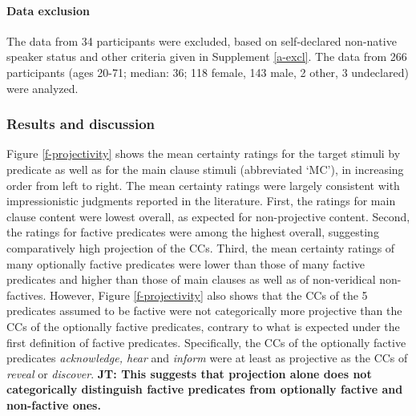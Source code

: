 \documentclass[11pt,fleqn]{article}
\newcommand{\6}{\mbox{$[\hspace*{-.6mm}[$}}
\newcommand{\9}{\mbox{$]\hspace*{-.6mm}]$}}
\newcommand{\jt}[1]{\textbf{\color{blue}JT: #1}}
\begin{document}

\paragraph{Data exclusion} The data from 34 participants were excluded, based on self-declared non-native speaker status and other criteria given in Supplement \ref{a-excl}. The data from 266 participants (ages 20-71; median: 36; 118 female, 143 male, 2 other, 3 undeclared) were analyzed.

\subsubsection{Results and discussion}\label{s22}

Figure \ref{f-projectivity} shows the mean certainty ratings for the target stimuli by predicate as well as for the main clause stimuli (abbreviated `MC'), in increasing order from left to right. The mean certainty ratings were largely consistent with impressionistic judgments reported in the literature. First, the ratings for main clause content were lowest overall, as expected for non-projective content. Second, the ratings for factive predicates were among the highest overall, suggesting comparatively high projection of the CCs. Third, the mean certainty ratings of many optionally factive predicates were lower than those of many factive predicates and higher than those of main clauses as well as of non-veridical non-factives. However, Figure \ref{f-projectivity} also shows that the CCs of the 5 predicates assumed to be factive were not categorically more projective than the CCs of the optionally factive predicates, contrary to what is expected under the first definition of factive predicates. Specifically, the CCs of the optionally factive predicates {\em acknowledge, hear} and {\em inform} were at least as projective as the CCs of {\em reveal} or {\em discover}. \jt{This suggests that projection alone does not categorically distinguish factive predicates from optionally factive and non-factive ones.}
\end{document}
